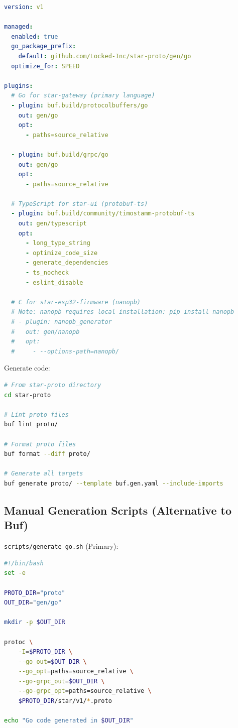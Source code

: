 \begin{lstlisting}[language=yaml, caption=buf.gen.yaml]
version: v1

managed:
  enabled: true
  go_package_prefix:
    default: github.com/Locked-Inc/star-proto/gen/go
  optimize_for: SPEED

plugins:
  # Go for star-gateway (primary language)
  - plugin: buf.build/protocolbuffers/go
    out: gen/go
    opt:
      - paths=source_relative

  - plugin: buf.build/grpc/go
    out: gen/go
    opt:
      - paths=source_relative

  # TypeScript for star-ui (protobuf-ts)
  - plugin: buf.build/community/timostamm-protobuf-ts
    out: gen/typescript
    opt:
      - long_type_string
      - optimize_code_size
      - generate_dependencies
      - ts_nocheck
      - eslint_disable

  # C for star-esp32-firmware (nanopb)
  # Note: nanopb requires local installation: pip install nanopb
  # - plugin: nanopb_generator
  #   out: gen/nanopb
  #   opt:
  #     - --options-path=nanopb/
\end{lstlisting}

Generate code:

\begin{lstlisting}[language=bash]
# From star-proto directory
cd star-proto

# Lint proto files
buf lint proto/

# Format proto files
buf format --diff proto/

# Generate all targets
buf generate proto/ --template buf.gen.yaml --include-imports
\end{lstlisting}

\subsection{Manual Generation Scripts (Alternative to Buf)}

\texttt{scripts/generate-go.sh} (Primary):

\begin{lstlisting}[language=bash, caption=generate-go.sh]
#!/bin/bash
set -e

PROTO_DIR="proto"
OUT_DIR="gen/go"

mkdir -p $OUT_DIR

protoc \
    -I=$PROTO_DIR \
    --go_out=$OUT_DIR \
    --go_opt=paths=source_relative \
    --go-grpc_out=$OUT_DIR \
    --go-grpc_opt=paths=source_relative \
    $PROTO_DIR/star/v1/*.proto

echo "Go code generated in $OUT_DIR"
\end{lstlisting}

